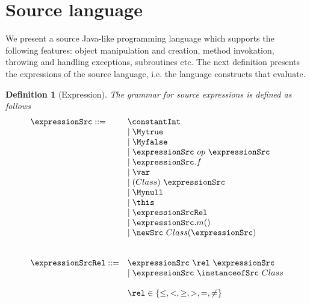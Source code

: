 
\newtheorem{Expression}{Definition}[section]
\newtheorem{ExpressionRel}[Expression]{Definition}
\newtheorem{Statement}[Expression]{Definition}

\section{Source language} \label{source}


We present a source Java-like programming language which supports the following features:
object manipulation and creation, method invokation, throwing and handling exceptions, subroutines etc.  
The  next definition presents the expressions of the source language, i.e. the language constructs that evaluate.

\begin{Expression}[Expression]\label{exprSrc}
    The grammar for source expressions  is defined as follows
    $$ \begin{array} {ll}    \expressionSrc ::=       
       		         	& \constantInt  \\
				& \mid \Mytrue \\ 
				& \mid \Myfalse \\
				& \mid \expressionSrc \ op \ \expressionSrc \\  
				& \mid \expressionSrc.f \\
				& \mid \var \\
  			        & \mid (Class) \ \expressionSrc \\
                                & \mid \Mynull  \\
				& \mid \this \\
              	        	& \mid \expressionSrcRel \\
				& \mid \expressionSrc.m( ) \\
				& \mid  \newSrc \ Class  ( \expressionSrc  ) \\ 
                                & \\
				& \\
        

     \expressionSrcRel ::=      & \expressionSrc \ \rel \ \expressionSrc \\
				& \mid \expressionSrc \ \instanceofSrc \ Class\\
				& \\   
				& \rel \in \{ \le, < ,  \ge, >, = , \neq \}                   
    \end{array} 
    $$
\end{Expression}


